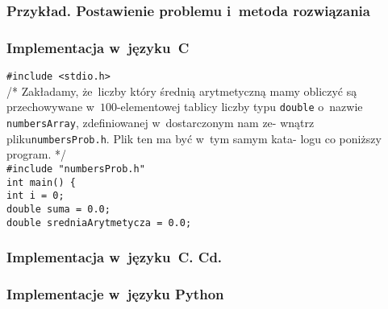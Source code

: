 \documentclass[10pt,t]{beamer}
\begin{document}
\begin{frame}
  \frametitle{Przykład. Postawienie problemu i~metoda rozwiązania}




\end{frame}





\begin{frame}
  \frametitle{Implementacja w~języku~C}


  \texttt{\#include <stdio.h>} \\
  \vspace{0.8em}
  /* Zakładamy, że~liczby który średnią arytmetyczną mamy obliczyć są
  przechowywane w~$100$-elementowej tablicy liczby typu \texttt{double}
  \hphantom{aa} o~nazwie \texttt{numbersArray}, zdefiniowanej
  w~dostarczonym nam ze-
  \hphantom{aa} wnątrz pliku\texttt{numbersProb.h}. Plik ten ma być w~tym
  samym kata-
  \hphantom{aa} logu co poniższy program. */ \\
  \texttt{\#include "numbersProb.h"} \\
  \vspace{0.8em}
  \texttt{int main() \{ } \\
  \hphantom{aaaa} \texttt{int i = 0;} \\
  \hphantom{aaaa} \texttt{double suma = 0.0;} \\
  \hphantom{aaaa} \texttt{double sredniaArytmetycza = 0.0;}

\end{frame}





\begin{frame}
  \frametitle{Implementacja w~języku~C. Cd.}




\end{frame}







\begin{frame}
  \frametitle{Implementacje w~języku Python}




\end{frame}
\end{document}

